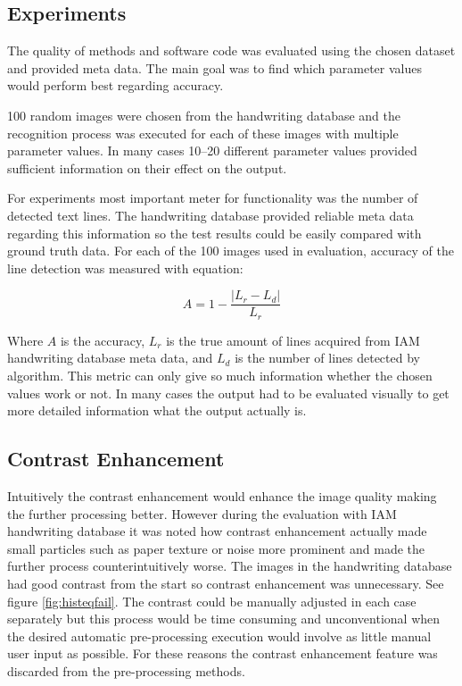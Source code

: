 \documentclass{article}
\begin{document}
  \subsection{Experiments}
    The quality of methods and software code was evaluated using the chosen dataset and provided meta data. The main goal was to find which parameter values would perform best regarding accuracy.

    100 random images were chosen from the handwriting database and the recognition process was executed for each of these images with multiple parameter values. In many cases 10--20 different parameter values provided sufficient information on their effect on the output.

    For experiments most important meter for functionality was the number of detected text lines. The handwriting database provided reliable meta data regarding this information so the test results could be easily compared with ground truth data. For each of the 100 images used in evaluation, accuracy of the line detection was measured with equation:

    \begin{equation}
      A = 1-\frac{|L_r-L_d|}{L_r}
    \end{equation}

    Where $A$ is the accuracy, $L_r$ is the true amount of lines acquired from IAM handwriting database meta data, and $L_d$ is the number of lines detected by algorithm. This metric can only give so much information whether the chosen values work or not. In many cases the output had to be evaluated visually to get more detailed information what the output actually is.


  \subsection{Contrast Enhancement}
    Intuitively the contrast enhancement would enhance the image quality making the further processing better. However during the evaluation with IAM handwriting database it was noted how contrast enhancement actually made small particles such as paper texture or noise more prominent and made the further process counterintuitively worse. The images in the handwriting database had good contrast from the start so contrast enhancement was unnecessary. See figure \ref{fig:histeqfail}. The contrast could be manually adjusted in each case separately but this process would be time consuming and unconventional when the desired automatic pre-processing execution would involve as little manual user input as possible. For these reasons the contrast enhancement feature was discarded from the pre-processing methods.
\end{document}
